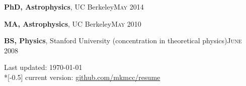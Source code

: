 \documentclass[11pt]{article}
\newcommand{\mysection}[1]{%
  \currentpdfbookmark{#1}{#1}
  \noindent{\Large \color{webbrown} \textsc{#1}}\\[-2ex]
  {\color{halfgray} \hrule}
  \vspace*{1ex}}
\begin{document}
\vspace*{\baselineskip}

\textbf{PhD, Astrophysics}, UC Berkeley\hfill\textsc{{May 2014}}
%

\textbf{MA, Astrophysics}, UC Berkeley\hfill\textsc{{May 2010}}
%

\textbf{BS, Physics}, Stanford University (concentration in
theoretical physics)\hfill\textsc{{June 2008}}
%
%


\enlargethispage{4\baselineskip}
\vfill
\begin{minipage}[h!]{\linewidth}
  \hspace*{\fill}
  \begin{center}
    {\scriptsize  Last updated: \today \\*[-0.5\baselineskip]
      current version: 
      \href{https://github.com/mkmcc/resume/raw/master/resume.pdf}%
      {github.com/mkmcc/resume}}
  \end{center}
  \hspace*{\fill}
\end{minipage}




\end{document}
